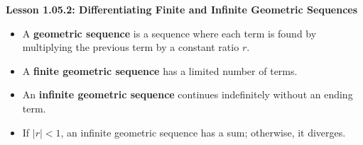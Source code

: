 \begin{center}
\textbf{Lesson 1.05.2: Differentiating Finite and Infinite Geometric Sequences}
\end{center}

\vspace*{-1.5ex}

\begin{itemize}
    \item A \textbf{geometric sequence} is a sequence where each term is found by multiplying the previous term by a constant ratio \( r \).
    \item A \textbf{finite geometric sequence} has a limited number of terms.
    \item An \textbf{infinite geometric sequence} continues indefinitely without an ending term.
    \item If \( |r| < 1 \), an infinite geometric sequence has a sum; otherwise, it diverges.
\end{itemize}

